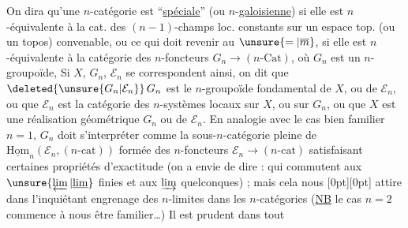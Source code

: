 %
On dira qu'une $n$-catégorie  est ``\uline{spéciale}'' (ou $n$-\uline{galoisienne}) si elle est $n$-équivalente à la cat. des $(n-1)$-champs loc. constants sur un espace top. (ou un topos) convenable, ou ce qui doit revenir au $\unsure{=|\overline m}$, si elle est $n$-équivalente à la catégorie des $n$-foncteurs $G_n\longrightarrow(n\text{-}\mathrm{Cat})$, où $G_n$ est un $n$-groupoïde, Si $X$, $G_n$, $\mathcal E_n$ se correspondent ainsi, on dit que $\deleted{\unsure{G_n|\mathcal E_n}}\,G_n$ est le $n$-groupoïde fondamental de $X$, ou de $\mathcal E_n$, ou que $\mathcal E_n$ est la catégorie des $n$-systèmes locaux sur $X$, ou sur $G_n$, ou que $X$ est une réalisation géométrique  $G_n$ ou de $\mathcal E_n$. En analogie avec le cas bien familier $n=1$, $G_n$ doit s'interpréter comme la sous-$n$-catégorie pleine de $\underline{\mathrm{Hom}}_n(\mathcal E_n,(n\text{-}\mathrm{cat}))$ formée des $n$-foncteurs $\mathcal E_n\to(n\text{-}\mathrm{cat})$ satisfaisant certaines propriétés d'exactitude (on a envie de dire : qui commutent aux $\unsure{\varprojlim|\underline{\lim}}$ finies et aux $\varinjlim$ quelconques) ; mais cela nous
\raisebox{-1.8ex}[0pt][0pt]{}
 attire dans l'inquiétant engrenage des $n$-limites dans les $n$-catégories (\uline{NB} le cas $n=2$ commence à nous être familier\ldots) Il est prudent dans tout
